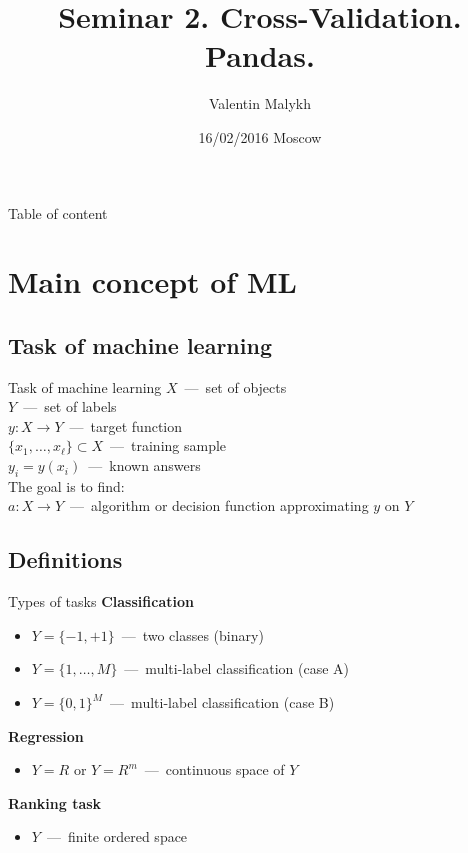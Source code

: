 \documentclass{beamer}
\title[\hbox to 56mm{Cross-Validation\hfill\insertframenumber\,/\,\inserttotalframenumber}]
    {Seminar 2. Cross-Validation. Pandas.}
\author[Valentin\,Malykh]
    {Valentin Malykh}
\institute[MIPT]{MIPT}
\date{16/02/2016 \vfill Moscow}
\begin{document}
\begin{frame}
  \titlepage
\end{frame}

\begin{frame}{Table of content}
  \tableofcontents
\end{frame}

\section{Main concept of ML}
\subsection{Task of machine learning}
\begin{frame}{Task of machine learning}
$X$~---~set of objects\\
$Y$~---~set of labels\\
$y:X\rightarrow Y$~---~target function\\
\bigskip
\medskip
$\{x_1,\dots,x_\ell\}\subset X$~---~training sample\\
$y_i = y(x_i)$~---~known answers\\
\bigskip
\medskip
The goal is to find:\\
$a: X \rightarrow Y$~---~algorithm or decision function approximating $y$ on $Y$\\
\end{frame}

\subsection{Definitions}
\begin{frame}{Types of tasks}
\textbf{Classification}
\begin{itemize}
\item $Y=\{-1,+1\}$~---~two classes (binary)
\item $Y=\{1,\dots,M\}$~---~multi-label classification (case A)
\item $Y=\{0,1\}^{M}$~---~multi-label classification (case B)
\end{itemize}
\medskip
\textbf{Regression}
\begin{itemize}
\item $Y=R$ or $Y=R^m$~---~continuous space of $Y$
\end{itemize}
\medskip
\textbf{Ranking task}
\begin{itemize}
\item $Y$~---~finite ordered space
\end{itemize}
\end{frame}
\end{document}

